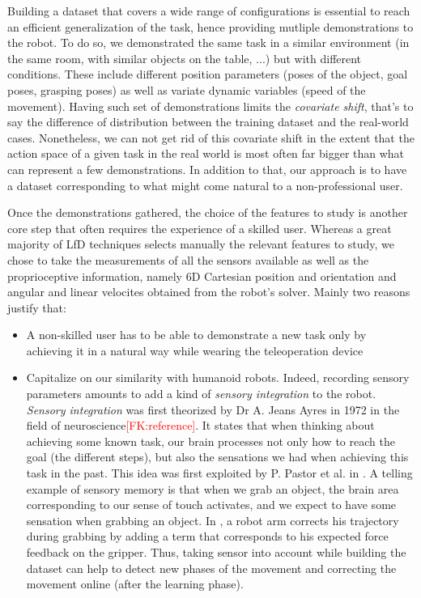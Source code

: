 \documentclass[conference]{IEEEtran}
\newcommand{\fk}[1]{\textcolor{red}{[FK:#1]}}
\begin{document}
Building a dataset that covers a wide range of configurations is essential to reach an efficient generalization of the task, hence providing mutliple demonstrations to the robot. To do so, we demonstrated the same task in a similar environment (in the same room, with similar objects on the table, ...) but with different conditions. These include different position parameters (poses of the object, goal poses, grasping poses) as well as variate dynamic variables (speed of the movement). Having such set of demonstrations limits the \textit{covariate  shift}, that's to say the difference of distribution between the training dataset and the real-world cases. Nonetheless, we can not get rid of  this covariate shift in the extent that the action space of a given task in the real world is most often far bigger than what can represent a few demonstrations. In addition to that, our approach is to have a dataset corresponding to what might come natural to a non-professional user.

Once the demonstrations gathered, the choice of the features to study is another core step that often requires the experience of a skilled user. Whereas a great majority of LfD techniques selects manually the relevant features to study, we chose to take the measurements of all the sensors available as well as the proprioceptive information, namely 6D Cartesian position and orientation and angular and linear velocites obtained from the robot's solver. Mainly two reasons justify that:

 \begin{itemize}
     \item A non-skilled user has to be able to demonstrate a new task only by achieving it in a  natural way while wearing the teleoperation device
     \item Capitalize on our similarity with humanoid robots. Indeed, recording sensory parameters amounts to add a kind of \textit{sensory integration} to the robot. \textit{Sensory integration} was first theorized by Dr A. Jeans Ayres in 1972 in the field of neuroscience\fk{reference}. It states that when thinking about achieving some known task, our brain processes not only how to reach the goal (the different steps), but also the sensations we had when achieving this task in the past. This idea was first exploited by P. Pastor et al. in \cite{sensory_skill}. A telling example of sensory memory is that when we grab an object, the brain area corresponding to our sense of touch activates, and we expect to have some sensation when grabbing an object. In \cite{sensory_skill}, a robot arm corrects his trajectory during grabbing by adding a term that corresponds to his expected force feedback on the gripper. Thus, taking sensor into account while building the dataset can help to detect new phases of the movement \cite{sensory_seg} and correcting the movement online (after the learning phase). \newline

\end{itemize}
\end{document}
